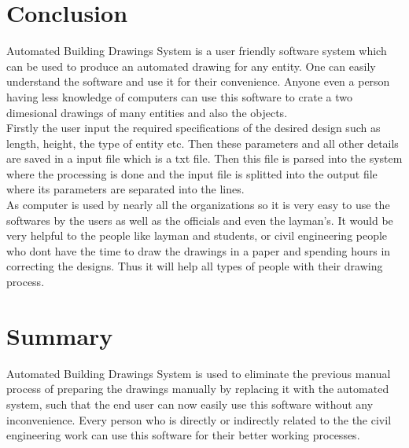 \section{Conclusion}
Automated Building Drawings System is a user friendly software system  which can be used to produce an automated drawing for any entity. One can easily understand the software and use it for their convenience. Anyone even a person having less knowledge of computers can use this software to crate a two dimesional drawings of many entities and also the objects. \\

\noindent Firstly the user input the required specifications of the desired design such as length, height, the type of entity etc. Then these parameters and all other details are saved in a input file which is a txt file. Then this file is parsed into the system where the processing is done and the input file is splitted into the output file where its parameters are separated into the lines.\\
 
\noindent As computer is used by nearly all the organizations so it is very easy to
use the softwares by the users as well as the officials and even the layman's. It would be very helpful to the people like layman and students,
or civil engineering people who dont have the time to draw the drawings in a paper and spending hours in correcting the designs. Thus it will help all types of people with their drawing process.
\section{Summary}
Automated Building Drawings System is used to eliminate the previous manual process of preparing the drawings manually by replacing it with the automated system, such that the end user can now easily use this software without any inconvenience. Every person who is directly or indirectly related to the the civil engineering work can use this software for their better working processes.\\

